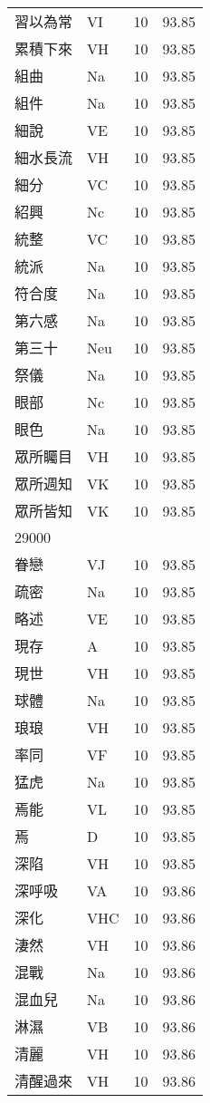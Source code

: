 \documentclass[twocolumn]{book}
\begin{document}
\begin{supertabular}{llrr}
習以為常 & VI & 10 &  93.85\\
累積下來 & VH & 10 &  93.85\\
組曲 & Na & 10 &  93.85\\
組件 & Na & 10 &  93.85\\
細說 & VE & 10 &  93.85\\
細水長流 & VH & 10 &  93.85\\
細分 & VC & 10 &  93.85\\
紹興 & Nc & 10 &  93.85\\
統整 & VC & 10 &  93.85\\
統派 & Na & 10 &  93.85\\
符合度 & Na & 10 &  93.85\\
第六感 & Na & 10 &  93.85\\
第三十 & Neu & 10 &  93.85\\
祭儀 & Na & 10 &  93.85\\
眼部 & Nc & 10 &  93.85\\
眼色 & Na & 10 &  93.85\\
眾所矚目 & VH & 10 &  93.85\\
眾所週知 & VK & 10 &  93.85\\
眾所皆知 & VK & 10 &  93.85\\
29000\\
眷戀 & VJ & 10 &  93.85\\
疏密 & Na & 10 &  93.85\\
略述 & VE & 10 &  93.85\\
現存 & A & 10 &  93.85\\
現世 & VH & 10 &  93.85\\
球體 & Na & 10 &  93.85\\
琅琅 & VH & 10 &  93.85\\
率同 & VF & 10 &  93.85\\
猛虎 & Na & 10 &  93.85\\
焉能 & VL & 10 &  93.85\\
焉 & D & 10 &  93.85\\
深陷 & VH & 10 &  93.85\\
深呼吸 & VA & 10 &  93.86\\
深化 & VHC & 10 &  93.86\\
淒然 & VH & 10 &  93.86\\
混戰 & Na & 10 &  93.86\\
混血兒 & Na & 10 &  93.86\\
淋濕 & VB & 10 &  93.86\\
清麗 & VH & 10 &  93.86\\
清醒過來 & VH & 10 &  93.86\\

\end{supertabular}
\end{document}
